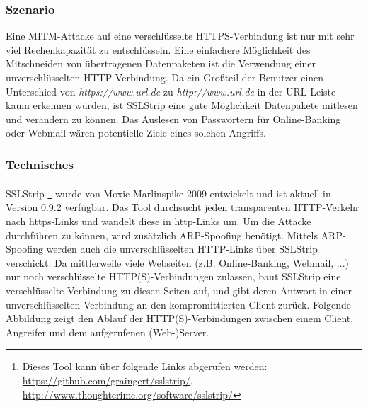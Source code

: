 \subsubsection*{Szenario}
Eine MITM-Attacke auf eine verschlüsselte HTTPS-Verbindung ist nur mit sehr viel Rechenkapazität zu entschlüsseln. Eine einfachere Möglichkeit des Mitschneiden von übertragenen Datenpaketen ist die Verwendung einer unverschlüsselten HTTP-Verbindung. Da ein Großteil der Benutzer einen Unterschied von \textit{https://www.url.de} zu \textit{http://www.url.de} in der URL-Leiste kaum erkennen würden, ist SSLStrip eine gute Möglichkeit Datenpakete mitlesen und verändern zu können. \newline
Das Auslesen von Passwörtern für Online-Banking oder Webmail wären potentielle Ziele eines solchen Angriffs.

\subsubsection*{Technisches}
SSLStrip \footnote{ Dieses Tool kann über folgende Links abgerufen werden: \url{https://github.com/graingert/sslstrip/}, \url{http://www.thoughtcrime.org/software/sslstrip/}} wurde von Moxie Marlinspike 2009 entwickelt und ist aktuell in Version 0.9.2 verfügbar. Das Tool durchsucht jeden transparenten HTTP-Verkehr nach https-Links und wandelt diese in http-Links um. Um die Attacke durchführen zu können, wird zusätzlich ARP-Spoofing benötigt. Mittels ARP-Spoofing werden auch die unverschlüsselten HTTP-Links über SSLStrip verschickt. Da mittlerweile viele Webseiten (z.B. Online-Banking, Webmail, ...) nur noch verschlüsselte HTTP(S)-Verbindungen zulassen, baut SSLStrip eine verschlüsselte Verbindung zu diesen Seiten auf, und gibt deren Antwort in einer unverschlüsselten Verbindung an den kompromittierten Client zurück. Folgende Abbildung zeigt den Ablauf der HTTP(S)-Verbindungen zwischen einem Client, Angreifer und dem aufgerufenen (Web-)Server. \newpage

